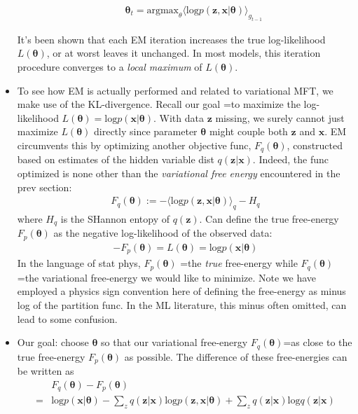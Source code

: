 \documentclass[norsk,a4paper,11pt]{article}
\begin{document}
\begin{itemize}
\begin{enumerate}
		\begin{align}
			\bm{\theta}_t = \text{argmax}_\theta \langle \text{log} p(\bm{z}, \bm{x}| \bm{\theta}) \rangle_{g_{t-1}}
		\end{align}
	\end{enumerate}
	It's been shown that each EM iteration increases the true log-likelihood $L(\bm{\theta})$, or at worst leaves it unchanged. In most models, this iteration procedure converges to a \textit{local maximum} of $L(\bm{\theta})$.
	\item To see how EM is actually performed and related to variational MFT, we make use of the KL-divergence. Recall our goal =to maximize the log-likelihood $L(\bm{\theta}) = \text{log}p(\bm{x}|\bm{\theta}) $. With data $\bm{z}$ missing, we surely cannot just maximize $L(\bm{\theta})$ directly since parameter $\bm{\theta}$ might couple both $\bm{z}$ and $\bm{x}$. EM circumvents this by optimizing another objective func, $F_q(\bm{\theta})$, constructed based on estimates of the hidden variable dist $q(\bm{z}|\bm{x})$. Indeed, the func optimized is none other than the \textit{variational free energy} encountered in the prev section:
	\begin{align}
		F_q(\bm{\theta}) := - \langle \text{log} p(\bm{z}, \bm{x}|\bm{\theta}) \rangle_q - H_q
	\end{align}
	where $H_q$ is the SHannon entopy of $q(\bm{z})$. Can define the true free-energy $F_p(\bm{\theta})$ as the negative log-likelihood of the observed data:
	\begin{align}
		-F_p(\bm{\theta}) = L(\bm{\theta}) = \text{log} p(\bm{x}|\bm{\theta})
	\end{align}
	In the language of stat phys, $F_p(\bm{\theta})$ =the \textit{true} free-energy while $F_q(\bm{\theta})$=the variational free-energy we would like to minimize. Note we have employed a physics sign convention here of defining the free-energy as minus log of the partition func. In the ML literature, this minus often omitted, can lead to some confusion.
	\item Our goal: choose $\bm{\theta}$ so that our variational free-energy $F_q(\bm{\theta})$=as close to the true free-energy $F_p(\bm{\theta})$ as possible. The difference of these free-energies can be written as
	\begin{align}
		& F_q(\bm{\theta}) - F_p(\bm{\theta}) \\
		=& \text{log}  p(\bm{x}|\bm{\theta}) - \sum_z q(\bm{z}|\bm{x}) \text{log} p(\bm{z}, \bm{x}| \bm{\theta}) + \sum_z q(\bm{z}|\bm{x}) \text{log}q(\bm{z}|\bm{x}) \\

\end{align}
\end{itemize}
\end{document}
